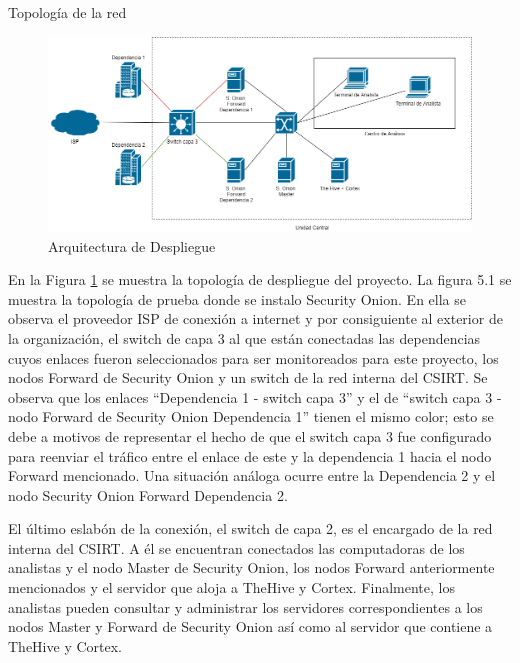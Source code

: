     \begin{section}{Topología de la red }
    \begin{figure}[H]
        \centering
        \includegraphics[width=1\textwidth]{./iteracion_1_imagenes/figura_33_arquitectura_despliegue_proyecto.png}
        \caption{Arquitectura de Despliegue}
        \label{fig:topologia_despliegue_proyecto}
    \end{figure}
    \FloatBarrier
    En la Figura \ref{fig:topologia_despliegue_proyecto} se muestra la topología de despliegue del proyecto. La figura 5.1 se muestra la topología de prueba donde se instalo Security Onion. En ella se observa el proveedor ISP de conexión a internet y por consiguiente al exterior de la organización, el switch de capa 3 al que están conectadas las dependencias cuyos enlaces fueron seleccionados para ser monitoreados para este proyecto, los nodos Forward de Security Onion y un switch de la red interna del CSIRT. Se observa que los enlaces “Dependencia 1 - switch capa 3” y el de “switch capa 3 - nodo Forward de Security Onion Dependencia 1” tienen el mismo color; esto se debe a motivos de representar el hecho de que el switch capa 3 fue configurado para reenviar el tráfico entre el enlace de este y la dependencia 1 hacia el nodo Forward mencionado. Una situación análoga ocurre entre la Dependencia 2 y el nodo Security Onion Forward Dependencia 2. \par
    El último eslabón de la conexión, el switch de capa 2, es el encargado de la red interna del CSIRT. A él se encuentran conectados las computadoras de los analistas y el nodo Master de Security Onion, los nodos Forward anteriormente mencionados y el servidor que aloja a TheHive y Cortex. Finalmente, los analistas pueden consultar y administrar los servidores correspondientes a los nodos Master y Forward de Security Onion así como al servidor que contiene a TheHive y Cortex. \par

   \end{section}
    
